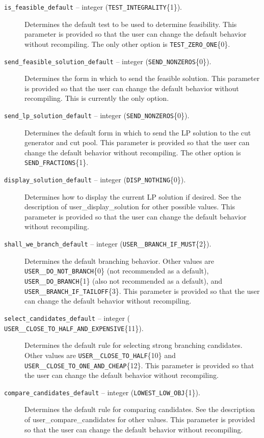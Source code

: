 \begin{description}
\item[{\tt is\_feasible\_default} -- integer ({\tt TEST\_INTEGRALITY}\{1\}).]
Determines the default test to be used to determine feasibility. This
parameter is provided so that the user can change the default behavior
without recompiling. The only other option is {\tt TEST\_ZERO\_ONE}\{0\}.

\item[{\tt send\_feasible\_solution\_default} -- integer 
({\tt SEND\_NONZEROS}\{0\}).]
Determines the form in which to send the feasible solution. This
parameter is provided so that the user can change the default behavior
without recompiling. This is currently the only option.

\item[{\tt send\_lp\_solution\_default} -- integer ({\tt SEND\_NONZEROS}\{0\}).]
Determines the default form in which to send the LP solution to the
cut generator and cut pool. This
parameter is provided so that the user can change the default behavior
without recompiling. The other option is {\tt SEND\_FRACTIONS}\{1\}.

\item[{\tt display\_solution\_default} -- integer ({\tt DISP\_NOTHING}\{0\}).]
Determines how to display the current LP solution if desired.
See the description of 
{user_display_solution} for other
possible values. This parameter is provided so that
the user can change the default behavior without recompiling.

\item[{\tt shall\_we\_branch\_default} -- integer 
({\tt USER\_\_BRANCH\_IF\_MUST}\{2\}).]
Determines the default branching behavior. Other values are {\tt
USER\_\_DO\_NOT\_BRANCH}\{0\} (not recommended as a default), {\tt
USER\_\_DO\_BRANCH}\{1\} (also not recommended as a default), and {\tt
USER\_\_BRANCH\_IF\_TAILOFF}\{3\}. This
parameter is provided so that the user can change the default behavior
without recompiling.

\item[{\tt select\_candidates\_default} -- integer ({\tt
USER\_\_CLOSE\_TO\_HALF\_AND\_EXPENSIVE}\{11\}).]
Determines the default rule for selecting strong branching candidates.
Other values are {\tt USER\_\_CLOSE\_TO\_HALF}\{10\} and 
{\tt USER\_\_CLOSE\_TO\_ONE\_AND\_CHEAP}\{12\}. This
parameter is provided so that the user can change the default behavior
without recompiling.

\item[{\tt compare\_candidates\_default} -- integer 
({\tt LOWEST\_LOW\_OBJ}\{1\}).]
Determines the default rule for comparing candidates. See the
description of 
{user_compare_candidates} for other values. This
parameter is provided so that the user can change the default behavior
without recompiling.


\end{description}

